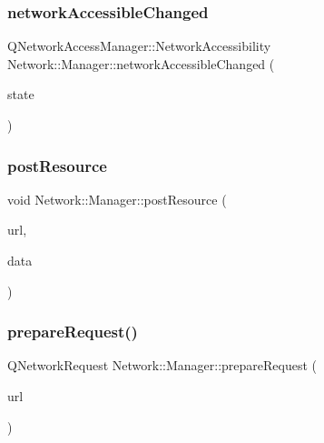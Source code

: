\subsubsection{\texorpdfstring{network\+Accessible\+Changed}{networkAccessibleChanged}}
{\footnotesize\ttfamily Q\+Network\+Access\+Manager\+::\+Network\+Accessibility Network\+::\+Manager\+::network\+Accessible\+Changed (\begin{DoxyParamCaption}\item[{Q\+Network\+Access\+Manager\+::\+Network\+Accessibility}]{state }\end{DoxyParamCaption})\hspace{0.3cm}{\ttfamily [signal]}}

\mbox{\label{classNetwork_1_1Manager_a88e7de8604594cf6c2689e8b7a0a6e6e}} 
\subsubsection{\texorpdfstring{post\+Resource}{postResource}}
{\footnotesize\ttfamily void Network\+::\+Manager\+::post\+Resource (\begin{DoxyParamCaption}\item[{const Q\+Url \&}]{url,  }\item[{const Q\+Byte\+Array \&}]{data }\end{DoxyParamCaption})\hspace{0.3cm}{\ttfamily [slot]}}

\mbox{\label{classNetwork_1_1Manager_aa9c1081a6e3ec9b937c3bbb9a7f7202f}} 
\subsubsection{\texorpdfstring{prepare\+Request()}{prepareRequest()}}
{\footnotesize\ttfamily Q\+Network\+Request Network\+::\+Manager\+::prepare\+Request (\begin{DoxyParamCaption}\item[{const Q\+Url \&}]{url }\end{DoxyParamCaption})\hspace{0.3cm}{\ttfamily [private]}}

